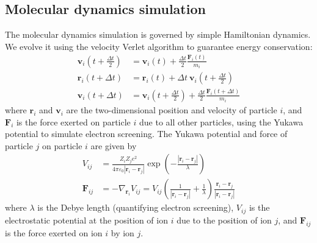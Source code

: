 \documentclass{article}
\begin{document}
\subsection{Molecular dynamics simulation}
The molecular dynamics simulation is governed by simple Hamiltonian dynamics. We evolve it using the velocity Verlet algorithm to guarantee energy conservation:
\begin{align*}
\mathbf{v}_i\left(t+\frac{\Delta t}{2}\right)  	&= \mathbf{v}_i(t) + \frac{\Delta t}{2}\frac{\mathbf{F}_i(t)}{m_i} \\
\mathbf{r}_i(t+\Delta t) 		   		&= \mathbf{r}_i(t) + \Delta t\:\mathbf{v}_i\left(t+\frac{\Delta t}{2}\right) \\
\mathbf{v}_i(t+\Delta t)			  	&= \mathbf{v}_i\left(t+\frac{\Delta t}{2}\right) + 
								\frac{\Delta t}{2}\frac{\mathbf{F}_i(t+\Delta t)}{m_i}
\end{align*}
where $\mathbf{r}_i$ and $\mathbf{v}_i$ are the two-dimensional position and velocity of particle $i$, and $\mathbf{F}_i$ is the force exerted on particle $i$ due to all other particles, using the Yukawa potential to simulate electron screening. The Yukawa potential and force of particle $j$ on particle $i$ are given by
\begin{align*}
V_{ij}	&= \frac{Z_i Z_j e^2}{4 \pi \varepsilon_0 |\mathbf{r}_i - \mathbf{r}_j|}\exp\left(-\frac{|\mathbf{r}_i - \mathbf{r}_j|}{\lambda}\right) \\
\mathbf{F}_{ij}	&= -\nabla_{\mathbf{r}_i}V_{ij} = V_{ij}\left(\frac{1}{|\mathbf{r}_i - \mathbf{r}_j|} + \frac{1}{\lambda}\right)\frac{\mathbf{r}_i - \mathbf{r}_j}{|\mathbf{r}_i - \mathbf{r}_j|}
\end{align*}
where $\lambda$ is the Debye length (quantifying electron screening), $V_{ij}$ is the electrostatic potential at the position of ion $i$ due to the position of ion $j$, and $\mathbf{F}_{ij}$ is the force exerted on ion $i$ by ion $j$.
\end{document}
